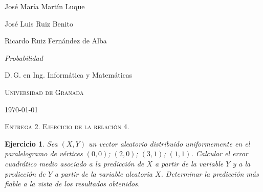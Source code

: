 \documentclass[
  a4paper,
  spanish,
  12pt,
]{scrartcl}
\theoremstyle{ejercicio-style}
\newtheorem{ejer}{Ejercicio}
\theoremstyle{remark-style}
\begin{document}
\begin{flushright}
  José María Martín Luque
  
  José Luis Ruiz Benito

  Ricardo Ruiz Fernández de Alba\vspace{.5em}

  \textit{Probabilidad}

  D.\,G. en Ing. Informática y Matemáticas

  \textsc{Universidad de Granada}\vspace{.5em}

  \today\vspace{.5em}
\end{flushright}

\begin{flushleft}
  \scshape\Large Entrega 2. Ejercicio de la relación 4.
\end{flushleft}

\setcounter{ejer}{13}

\begin{ejer}
  Sea \((X, Y)\) un vector aleatorio distribuido uniformemente en el paralelogramo de vértices \((0,0)\); \((2,0)\); \((3,1)\); \((1,1)\). Calcular el error cuadrático medio asociado a la predicción de \(X\) a partir de la variable \(Y\) y a la predicción de \(Y\) a partir de la variable aleatoria \(X\). Determinar la predicción más fiable a la vista de los resultados obtenidos.
\end{ejer}
\end{document}

